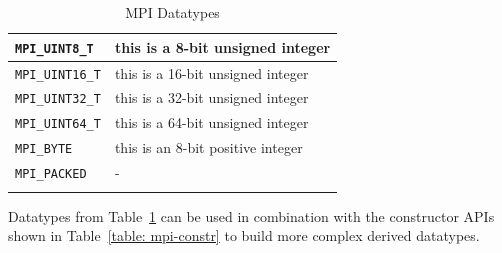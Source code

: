 \documentclass{../../template/esiwace-report}
\begin{document}
\begin{longtable}{|>{\centering\arraybackslash} m{5.5cm} | >{\centering\arraybackslash} m{6cm} |}
        \small \texttt{MPI\_UINT8\_T}                 & \small this is a 8-bit unsigned integer                                                       \\ \hline
        \small \texttt{MPI\_UINT16\_T}                & \small this is a 16-bit unsigned integer                                                      \\ \hline
        \small \texttt{MPI\_UINT32\_T}                & \small this is a 32-bit unsigned integer                                                      \\ \hline
        \small \texttt{MPI\_UINT64\_T}                & \small this is a 64-bit unsigned integer                                                      \\ \hline
        \small \texttt{MPI\_BYTE}                     & \small this is an 8-bit positive integer                                                      \\ \hline
        \small \texttt{MPI\_PACKED}                   & -                                                                                             \\ \hline
        \caption{MPI Datatypes}
        \label{table: mpi-types}
\end{longtable}

Datatypes from Table~\ref{table: mpi-types} can be used in combination with the constructor APIs shown in Table~\ref{table: mpi-constr} to build more complex derived datatypes.
\end{document}

